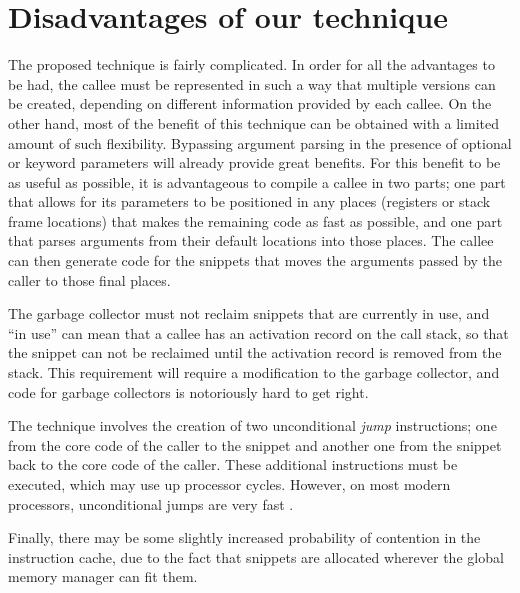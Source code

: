 \section{Disadvantages of our technique}

The proposed technique is fairly complicated.  In order for all the
advantages to be had, the callee must be represented in such a way
that multiple versions can be created, depending on different
information provided by each callee.  On the other hand, most of the
benefit of this technique can be obtained with a limited amount of
such flexibility.  Bypassing argument parsing in the presence of
optional or keyword parameters will already provide great benefits.
For this benefit to be as useful as possible, it is advantageous to
compile a callee in two parts; one part that allows for its parameters
to be positioned in any places (registers or stack frame locations)
that makes the remaining code as fast as possible, and one part that
parses arguments from their default locations into those places.  The
callee can then generate code for the snippets that moves the
arguments passed by the caller to those final places.

The garbage collector must not reclaim snippets that are currently in
use, and ``in use'' can mean that a callee has an activation record on
the call stack, so that the snippet can not be reclaimed until the
activation record is removed from the stack.  This requirement will
require a modification to the garbage collector, and code for garbage
collectors is notoriously hard to get right.

The technique involves the creation of two unconditional \emph{jump}
instructions; one from the core code of the caller to the snippet and
another one from the snippet back to the core code of the caller.
These additional instructions must be executed, which may use up
processor cycles.  However, on most modern processors, unconditional
jumps are very fast \cite{10.5555/3207796}.

Finally, there may be some slightly increased probability of
contention in the instruction cache, due to the fact that snippets are
allocated wherever the global memory manager can fit them.

